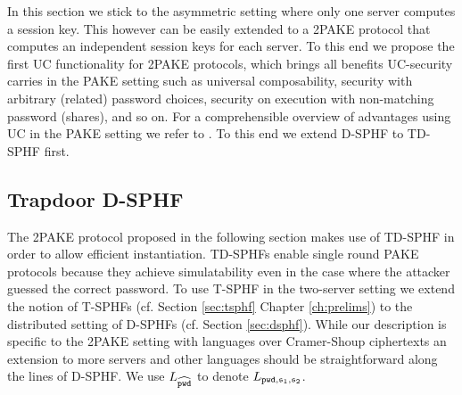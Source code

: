 In this section we stick to the asymmetric setting where only one server computes a session key.
This however can be easily extended to a \ac{2PAKE} protocol that computes an independent session keys for each server.
To this end we propose the first \ac{UC} functionality for \ac{2PAKE} protocols, which brings all benefits \ac{UC}-security carries in the \ac{PAKE} setting such as universal composability, security with arbitrary (related) password choices, security on execution with non-matching password (shares), and so on.
For a comprehensible overview of advantages using \ac{UC} in the \ac{PAKE} setting we refer to \citet{Canetti2005}.
To this end we extend \ac{D-SPHF} to \ac{TD-SPHF} first.


\subsection{Trapdoor D-SPHF}\label{sec:tdsphf}
The \ac{2PAKE} protocol proposed in the following section makes use of \ac{TD-SPHF} in order to allow efficient instantiation.
\acp{TD-SPHF} enable single round \ac{PAKE} protocols because they achieve simulatability even in the case where the attacker guessed the correct password.
To use \ac{T-SPHF} in the two-server setting we extend the notion of \acp{T-SPHF} (cf. Section \ref{sec:tsphf} Chapter \ref{ch:prelims}) to the distributed setting of \acp{D-SPHF} (cf. Section \ref{sec:dsphf}).
While our description is specific to the \ac{2PAKE} setting with languages over Cramer-Shoup ciphertexts an extension to more servers and other languages should be straightforward along the lines of \ac{D-SPHF}.
We use $L_{\widehat{\mathtt{pwd}}}$ to denote $L_{\mathtt{pwd}, \mathfrak{s}_1, \mathfrak{s}_2}$.

